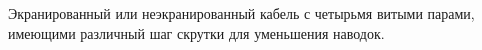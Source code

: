 Экранированный или неэкранированный кабель с
четырьмя витыми парами, имеющими различный шаг скрутки
для уменьшения наводок.